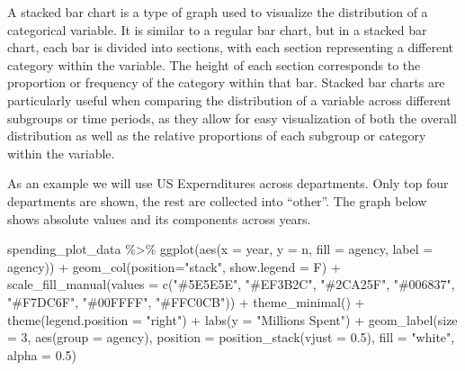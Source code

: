 \documentclass[
  letterpaper,
]{book}
\newenvironment{Shaded}{\begin{snugshade}}{\end{snugshade}}
\newcommand{\AttributeTok}[1]{\textcolor[rgb]{0.40,0.45,0.13}{#1}}
\newcommand{\DecValTok}[1]{\textcolor[rgb]{0.68,0.00,0.00}{#1}}
\newcommand{\FloatTok}[1]{\textcolor[rgb]{0.68,0.00,0.00}{#1}}
\newcommand{\FunctionTok}[1]{\textcolor[rgb]{0.28,0.35,0.67}{#1}}
\newcommand{\NormalTok}[1]{\textcolor[rgb]{0.00,0.23,0.31}{#1}}
\newcommand{\SpecialCharTok}[1]{\textcolor[rgb]{0.37,0.37,0.37}{#1}}
\newcommand{\StringTok}[1]{\textcolor[rgb]{0.13,0.47,0.30}{#1}}
\begin{document}
A stacked bar chart is a type of graph used to visualize the
distribution of a categorical variable. It is similar to a regular bar
chart, but in a stacked bar chart, each bar is divided into sections,
with each section representing a different category within the variable.
The height of each section corresponds to the proportion or frequency of
the category within that bar. Stacked bar charts are particularly useful
when comparing the distribution of a variable across different subgroups
or time periods, as they allow for easy visualization of both the
overall distribution as well as the relative proportions of each
subgroup or category within the variable.

As an example we will use US Expernditures across departments. Only top
four departments are shown, the rest are collected into ``other''. The
graph below shows absolute values and its components across years.

\begin{Shaded}
\begin{Highlighting}[]
\NormalTok{spending\_plot\_data }\SpecialCharTok{\%\textgreater{}\%} 
  \FunctionTok{ggplot}\NormalTok{(}\FunctionTok{aes}\NormalTok{(}\AttributeTok{x =}\NormalTok{ year, }\AttributeTok{y =}\NormalTok{ n, }\AttributeTok{fill =}\NormalTok{ agency, }\AttributeTok{label =}\NormalTok{ agency)) }\SpecialCharTok{+} 
  \FunctionTok{geom\_col}\NormalTok{(}\AttributeTok{position=}\StringTok{"stack"}\NormalTok{, }\AttributeTok{show.legend =}\NormalTok{ F) }\SpecialCharTok{+}
  \FunctionTok{scale\_fill\_manual}\NormalTok{(}\AttributeTok{values =} \FunctionTok{c}\NormalTok{(}\StringTok{"\#5E5E5E"}\NormalTok{, }\StringTok{"\#EF3B2C"}\NormalTok{, }\StringTok{"\#2CA25F"}\NormalTok{, }\StringTok{"\#006837"}\NormalTok{, }\StringTok{"\#F7DC6F"}\NormalTok{, }\StringTok{"\#00FFFF"}\NormalTok{, }\StringTok{"\#FFC0CB"}\NormalTok{)) }\SpecialCharTok{+} \FunctionTok{theme\_minimal}\NormalTok{() }\SpecialCharTok{+} \FunctionTok{theme}\NormalTok{(}\AttributeTok{legend.position =} \StringTok{"right"}\NormalTok{) }\SpecialCharTok{+} \FunctionTok{labs}\NormalTok{(}\AttributeTok{y =} \StringTok{"Millions Spent"}\NormalTok{) }\SpecialCharTok{+} 
  \FunctionTok{geom\_label}\NormalTok{(}\AttributeTok{size =} \DecValTok{3}\NormalTok{, }\FunctionTok{aes}\NormalTok{(}\AttributeTok{group =}\NormalTok{ agency), }\AttributeTok{position =} \FunctionTok{position\_stack}\NormalTok{(}\AttributeTok{vjust =} \FloatTok{0.5}\NormalTok{), }\AttributeTok{fill =} \StringTok{"white"}\NormalTok{, }\AttributeTok{alpha =} \FloatTok{0.5}\NormalTok{)}
\end{Highlighting}
\end{Shaded}
\end{document}
